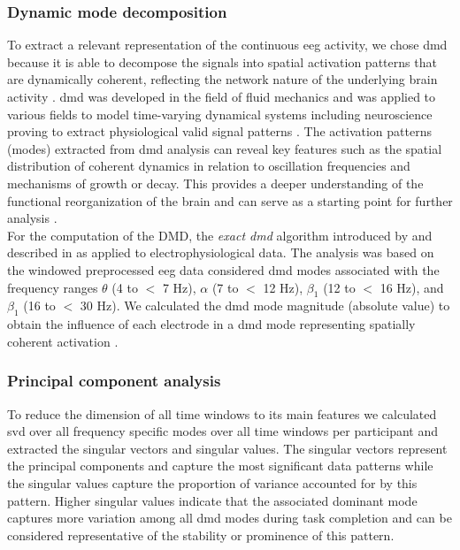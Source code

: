 \subsubsection{Dynamic mode decomposition}
To extract a relevant representation of the continuous \gls{eeg} activity, we chose \gls{dmd} because it is able to decompose the signals into spatial activation patterns that are dynamically coherent, reflecting the network nature of the underlying brain activity \cite{Brunton2016}. \Gls{dmd} was developed in the field of fluid mechanics and was applied to various fields to model time-varying dynamical systems including neuroscience proving to extract physiological valid signal patterns \cite{Brunton2016, Kunert-Graf2019}. The activation patterns (modes) extracted from \gls{dmd} analysis can reveal key features such as the spatial distribution of coherent dynamics in relation to oscillation frequencies and mechanisms of growth or decay. This provides a deeper understanding of the functional reorganization of the brain and can serve as a starting point for further analysis \cite{Brunton2016}.\\
For the computation of the DMD, the \textit{exact \gls{dmd}} algorithm introduced by \citeauthor{Tu2014} \cite{Tu2014} and described in \cite{Brunton2016} as applied to electrophysiological data. The analysis was based on the windowed preprocessed \gls{eeg} data considered \gls{dmd} modes associated with the frequency ranges $\theta$ (4 to $<$ 7 Hz), $\alpha$ (7 to $<$ 12 Hz), $\beta_1$ (12 to $<$ 16 Hz), and $\beta_1$ (16 to $<$ 30 Hz). We calculated the \gls{dmd} mode magnitude (absolute value) to obtain the influence of each electrode in a \gls{dmd} mode representing spatially coherent activation \cite{Brunton2016}.

\subsubsection{Principal component analysis}
To reduce the dimension of all time windows to its main features we calculated \gls{svd} over all frequency specific modes over all time windows per participant and extracted the singular vectors and singular values. The singular vectors represent the principal components and capture the most significant data patterns while the singular values capture the proportion of variance accounted for by this pattern. Higher singular values indicate that the associated dominant mode captures more variation among all \gls{dmd} modes during task completion and can be considered representative of the stability or prominence of this pattern.

